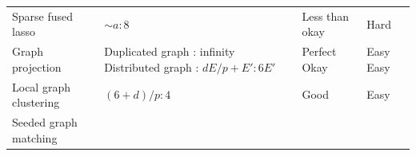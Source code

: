 \documentclass[10pt,oneside]{memoir}
\begin{document}
\begin{longtable}[]{@{}llll@{}}
\begin{minipage}[t]{0.23\columnwidth}
Sparse fused lasso\strut
\end{minipage} & \begin{minipage}[t]{0.35\columnwidth}\raggedright
\(\sim a:8\)\strut
\end{minipage} & \begin{minipage}[t]{0.11\columnwidth}\raggedright
Less than okay\strut
\end{minipage} & \begin{minipage}[t]{0.19\columnwidth}\raggedright
Hard\strut
\end{minipage}\tabularnewline
\begin{minipage}[t]{0.23\columnwidth}\raggedright
Graph projection\strut
\end{minipage} & \begin{minipage}[t]{0.35\columnwidth}\raggedright
Duplicated graph : infinity \linebreak Distributed graph :
\(dE/p + E' : 6E'\)\strut
\end{minipage} & \begin{minipage}[t]{0.11\columnwidth}\raggedright
Perfect \linebreak Okay\strut
\end{minipage} & \begin{minipage}[t]{0.19\columnwidth}\raggedright
Easy \linebreak Easy\strut
\end{minipage}\tabularnewline
\begin{minipage}[t]{0.23\columnwidth}\raggedright
Local graph clustering\strut
\end{minipage} & \begin{minipage}[t]{0.35\columnwidth}\raggedright
\((6 + d)/p : 4\)\strut
\end{minipage} & \begin{minipage}[t]{0.11\columnwidth}\raggedright
Good\strut
\end{minipage} & \begin{minipage}[t]{0.19\columnwidth}\raggedright
Easy\strut
\end{minipage}\tabularnewline
\begin{minipage}[t]{0.23\columnwidth}\raggedright
Seeded graph matching\strut
\end{minipage} & \begin{minipage}[t]{0.35\columnwidth}\raggedright
\strut
\end{minipage} & \begin{minipage}[t]{0.11\columnwidth}\raggedright
\strut
\end{minipage} & \begin{minipage}[t]{0.19\columnwidth}\raggedright

\end{minipage}
\end{longtable}
\end{document}
